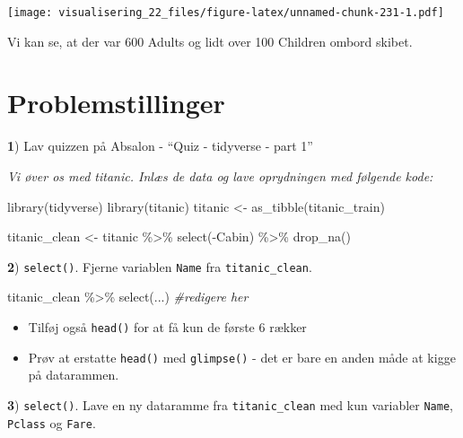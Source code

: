 \documentclass[
]{book}
\newenvironment{Shaded}{\begin{snugshade}}{\end{snugshade}}
\newcommand{\CommentTok}[1]{\textcolor[rgb]{0.56,0.35,0.01}{\textit{#1}}}
\newcommand{\FunctionTok}[1]{\textcolor[rgb]{0.00,0.00,0.00}{#1}}
\newcommand{\NormalTok}[1]{#1}
\newcommand{\OtherTok}[1]{\textcolor[rgb]{0.56,0.35,0.01}{#1}}
\newcommand{\SpecialCharTok}[1]{\textcolor[rgb]{0.00,0.00,0.00}{#1}}
\providecommand{\tightlist}{%
  \setlength{\itemsep}{0pt}\setlength{\parskip}{0pt}}
\begin{document}
\texttt{[image: visualisering\_22\_files/figure-latex/unnamed-chunk-231-1.pdf]}

Vi kan se, at der var 600 Adults og lidt over 100 Children ombord skibet.

\hypertarget{problemstillinger-4}{%
\section{Problemstillinger}\label{problemstillinger-4}}

\textbf{1}) Lav quizzen på Absalon - ``Quiz - tidyverse - part 1''

\emph{Vi øver os med titanic. Inlæs de data og lave oprydningen med følgende kode:}

\begin{Shaded}
\begin{Highlighting}[]
\FunctionTok{library}\NormalTok{(tidyverse)}
\FunctionTok{library}\NormalTok{(titanic)}
\NormalTok{titanic }\OtherTok{\textless{}{-}} \FunctionTok{as\_tibble}\NormalTok{(titanic\_train)}

\NormalTok{titanic\_clean }\OtherTok{\textless{}{-}}\NormalTok{ titanic }\SpecialCharTok{\%\textgreater{}\%} 
    \FunctionTok{select}\NormalTok{(}\SpecialCharTok{{-}}\NormalTok{Cabin) }\SpecialCharTok{\%\textgreater{}\%} 
    \FunctionTok{drop\_na}\NormalTok{()}
\end{Highlighting}
\end{Shaded}

\textbf{2}) \texttt{select()}. Fjerne variablen \texttt{Name} fra \texttt{titanic\_clean}.

\begin{Shaded}
\begin{Highlighting}[]
\NormalTok{titanic\_clean }\SpecialCharTok{\%\textgreater{}\%} 
    \FunctionTok{select}\NormalTok{(...) }\CommentTok{\#redigere her}
\end{Highlighting}
\end{Shaded}

\begin{itemize}
\tightlist
\item
  Tilføj også \texttt{head()} for at få kun de første 6 rækker
\item
  Prøv at erstatte \texttt{head()} med \texttt{glimpse()} - det er bare en anden måde at kigge på datarammen.
\end{itemize}

\textbf{3}) \texttt{select()}. Lave en ny dataramme fra \texttt{titanic\_clean} med kun variabler \texttt{Name}, \texttt{Pclass} og \texttt{Fare}.
\end{document}
